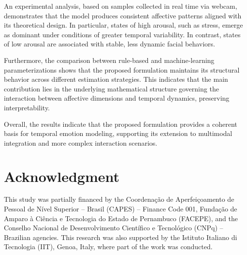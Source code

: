 \documentclass[letterpaper, 10 pt, conference]{ieeeconf}  %
\begin{document}
An experimental analysis, based on samples collected in real time via webcam, demonstrates that the model produces consistent affective patterns aligned with its theoretical design. In particular, states of high arousal, such as stress, emerge as dominant under conditions of greater temporal variability. In contrast, states of low arousal are associated with stable, less dynamic facial behaviors.

Furthermore, the comparison between rule-based and machine-learning parameterizations shows that the proposed formulation maintains its structural behavior across different estimation strategies. This indicates that the main contribution lies in the underlying mathematical structure governing the interaction between affective dimensions and temporal dynamics, preserving interpretability.

Overall, the results indicate that the proposed formulation provides a coherent basis for temporal emotion modeling, supporting its extension to multimodal integration and more complex interaction scenarios.


\section*{Acknowledgment}

This study was partially financed by the Coordenação de Aperfeiçoamento de Pessoal de Nível Superior – Brasil (CAPES) – Finance Code 001, Fundação de Amparo à Ciência e Tecnologia do Estado de Pernambuco (FACEPE), and the Conselho Nacional de Desenvolvimento Científico e Tecnológico (CNPq) – Brazilian agencies. This research was also supported by the Istituto Italiano di Tecnologia (IIT), Genoa, Italy, where part of the work was conducted.





\end{document}
